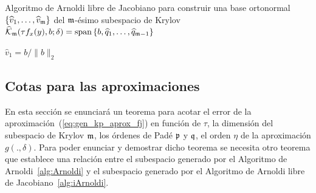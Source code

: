 {\SetAlgoNoLine
	\begin{algorithm}
		\caption{Algoritmo de Arnoldi libre de Jacobiano para construir una base ortonormal $\{\widehat{v}_1,\ldots,\widehat{v}_{\mathfrak{m}} \}$ 
			del $\mathfrak{m}$-ésimo subespacio de Krylov $\widehat{\mathcal{K}}_{\mathfrak{m}}(\tau f_x(y),b;\delta) = \mathrm{span} \left\{ b,\widehat{q}_1,\ldots,\widehat{q}_{\mathfrak{m}-1} \right\}$}
		\label{alg:iArnoldi}
		$\widehat{v}_1=b/\lVert b \rVert_2$\\
	\end{algorithm}
}

 \subsection{Cotas para las aproximaciones}
  En esta sección se enunciará un teorema para acotar el error de la aproximación~(\ref{eq:gen_kp_aprox_fj}) en función de $\tau$, la dimensión del subespacio de Krylov $\mathfrak{m}$, los órdenes de Padé $\mathfrak{p}$ y $\mathfrak{q}$, el orden $\eta$ de la aproximación $g(.,\delta)$. Para poder enunciar  y demostrar dicho teorema se necesita otro teorema que establece una relación entre el subespacio generado por el Algoritmo de Arnoldi~\ref{alg:Arnoldi} y el subespacio generado por el Algoritmo de Arnoldi libre de Jacobiano~\ref{alg:iArnoldi}.

